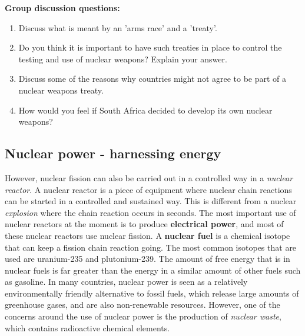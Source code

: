 {\textbf{Group discussion questions:\\}

\begin{enumerate}
\item{Discuss what is meant by an 'arms race' and a 'treaty'.}
\item{Do you think it is important to have such treaties in place to control the testing and use of nuclear weapons? Explain your answer.}
\item{Discuss some of the reasons why countries might not agree to be part of a nuclear weapons treaty.}
\item{How would you feel if South Africa decided to develop its own nuclear weapons?}
\end{enumerate}
}

\subsection{Nuclear power - harnessing energy}
\label{subsec:an:nfiss:power}

However, nuclear fission can also be carried out in a controlled way in a \textit{nuclear reactor}. A nuclear reactor is a piece of equipment where nuclear chain reactions can be started in a controlled and sustained way. This is different from a nuclear \textit{explosion} where the chain reaction occurs in seconds. The most important use of nuclear reactors at the moment is to produce \textbf{electrical power}, and most of these nuclear reactors use nuclear fission. A \textbf{nuclear fuel} is a chemical isotope that can keep a fission chain reaction going. The most common isotopes that are used are uranium-235 and plutonium-239. The amount of free energy that is in nuclear fuels is far greater than the energy in a similar amount of other fuels such as gasoline. In many countries, nuclear power is seen as a relatively environmentally friendly alternative to fossil fuels, which release large amounts of greenhouse gases, and are also non-renewable resources. However, one of the concerns around the use of nuclear power is the production of \textit{nuclear waste}, which contains radioactive chemical elements.

